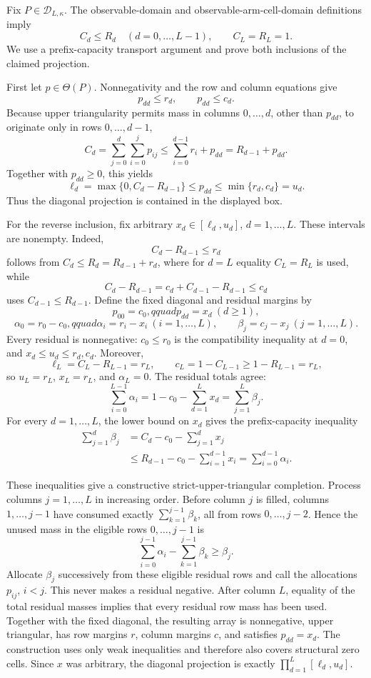 Fix \(P\in\mathcal D_{L,\kappa}\).  The observable-domain and observable-arm-cell-domain definitions imply
\[
 C_d\le R_d\quad(d=0,\ldots,L-1),
 \qquad C_L=R_L=1.
\]
We use a prefix-capacity transport argument and prove both inclusions of the claimed projection.

First let \(p\in\Theta(P)\).  Nonnegativity and the row and column equations give
\[
 p_{dd}\le r_d,
 \qquad
 p_{dd}\le c_d.
\]
Because upper triangularity permits mass in columns \(0,\ldots,d\), other than \(p_{dd}\), to originate only in rows \(0,\ldots,d-1\),
\[
 C_d
 =\sum_{j=0}^{d}\sum_{i=0}^{j}p_{ij}
 \le \sum_{i=0}^{d-1}r_i+p_{dd}
 =R_{d-1}+p_{dd}.
\]
Together with \(p_{dd}\ge0\), this yields
\[
 \ell_d=\max\{0,C_d-R_{d-1}\}
 \le p_{dd}
 \le \min\{r_d,c_d\}=u_d.
\]
Thus the diagonal projection is contained in the displayed box.

For the reverse inclusion, fix arbitrary \(x_d\in[\ell_d,u_d]\), \(d=1,\ldots,L\).  These intervals are nonempty.  Indeed,
\[
 C_d-R_{d-1}\le r_d
\]
follows from \(C_d\le R_d=R_{d-1}+r_d\), where for \(d=L\) equality \(C_L=R_L\) is used, while
\[
 C_d-R_{d-1}
 =c_d+C_{d-1}-R_{d-1}
 \le c_d
\]
uses \(C_{d-1}\le R_{d-1}\).  Define the fixed diagonal and residual margins by
\[
 p_{00}=c_0,qquad p_{dd}=x_d\ (d\ge1),
\]
\[
 \alpha_0=r_0-c_0,qquad
 \alpha_i=r_i-x_i\ (i=1,\ldots,L),
 \qquad
 \beta_j=c_j-x_j\ (j=1,\ldots,L).
\]
Every residual is nonnegative: \(c_0\le r_0\) is the compatibility inequality at \(d=0\), and \(x_d\le u_d\le r_d,c_d\).  Moreover,
\[
 \ell_L=C_L-R_{L-1}=r_L,
 \qquad
 c_L=1-C_{L-1}\ge1-R_{L-1}=r_L,
\]
so \(u_L=r_L\), \(x_L=r_L\), and \(\alpha_L=0\).  The residual totals agree:
\[
 \sum_{i=0}^{L-1}\alpha_i
 =1-c_0-\sum_{d=1}^{L}x_d
 =\sum_{j=1}^{L}\beta_j.
\]
For every \(d=1,\ldots,L\), the lower bound on \(x_d\) gives the prefix-capacity inequality
\[
 \begin{aligned}
 \sum_{j=1}^{d}\beta_j
 &=C_d-c_0-\sum_{j=1}^{d}x_j\\
 &\le R_{d-1}-c_0-\sum_{i=1}^{d-1}x_i
 =\sum_{i=0}^{d-1}\alpha_i.
 \end{aligned}
\]

These inequalities give a constructive strict-upper-triangular completion.  Process columns \(j=1,\ldots,L\) in increasing order.  Before column \(j\) is filled, columns \(1,\ldots,j-1\) have consumed exactly \(\sum_{k=1}^{j-1}\beta_k\), all from rows \(0,\ldots,j-2\).  Hence the unused mass in the eligible rows \(0,\ldots,j-1\) is
\[
 \sum_{i=0}^{j-1}\alpha_i-
 \sum_{k=1}^{j-1}\beta_k
 \ge \beta_j.
\]
Allocate \(\beta_j\) successively from these eligible residual rows and call the allocations \(p_{ij}\), \(i<j\).  This never makes a residual negative.  After column \(L\), equality of the total residual masses implies that every residual row mass has been used.  Together with the fixed diagonal, the resulting array is nonnegative, upper triangular, has row margins \(r\), column margins \(c\), and satisfies \(p_{dd}=x_d\).  The construction uses only weak inequalities and therefore also covers structural zero cells.  Since \(x\) was arbitrary, the diagonal projection is exactly \(\prod_{d=1}^{L}[\ell_d,u_d]\).

